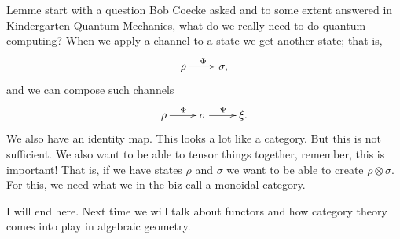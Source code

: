 \documentclass[english,12pt]{article}
\theoremstyle{definition}
\begin{document}
Lemme start with a question Bob Coecke asked and to some extent answered in \href{https://arxiv.org/abs/quant-ph/0510032}{Kindergarten Quantum
Mechanics}, what do we really need to do quantum computing? When we apply a
channel to a state we get another state; that is,
\begin{equation}
  \xymatrix{
    \rho \ar[r]^\Phi & \sigma,
  }
\end{equation}
and we can compose such channels
\begin{equation}
  \xymatrix{
    \rho \ar[r]^\Phi & \sigma \ar[r]^\Psi & \xi.
  }
\end{equation}
We also have an identity map. This looks a lot like a category. But this is
not sufficient. We also want to be able to tensor things together,
remember, this is important! That is, if we have states $\rho$ and $\sigma$
we want to be able to create $\rho \otimes \sigma$. For this, we need what
we in the biz call a
\href{https://ncatlab.org/nlab/show/monoidal+category}{monoidal category}.

\vspace{4mm}
I will end here. Next time we will talk about functors and how category
theory comes into play in algebraic geometry.
\end{document}
